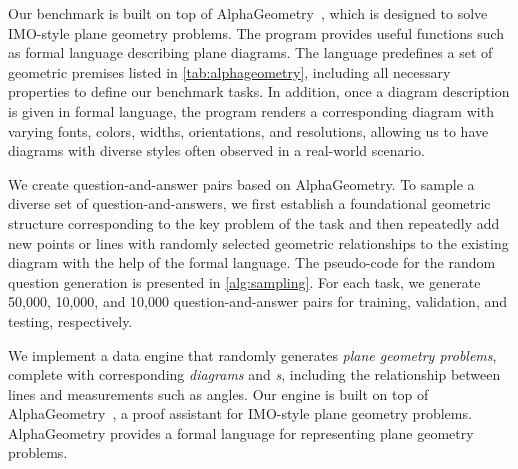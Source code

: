 

Our benchmark is built on top of AlphaGeometry~\citep{alphageometry}, which is designed to solve IMO-style plane geometry problems. The program provides useful functions such as formal language describing plane diagrams. The language predefines a set of geometric premises listed in \cref{tab:alphageometry}, including all necessary properties to define our benchmark tasks. In addition, once a diagram description is given in formal language, the program renders a corresponding diagram with varying fonts, colors, widths, orientations, and resolutions, allowing us to have diagrams with diverse styles often observed in a real-world scenario.

We create question-and-answer pairs based on AlphaGeometry. To sample a diverse set of question-and-answers, we first establish a foundational geometric structure corresponding to the key problem of the task and then repeatedly add new points or lines with randomly selected geometric relationships to the existing diagram with the help of the formal language. The pseudo-code for the random question generation is presented in \cref{alg:sampling}. For each task, we generate 50,000, 10,000, and 10,000 question-and-answer pairs for training, validation, and testing, respectively.

\iffalse
We implement a data engine that randomly generates \emph{plane geometry problems}, complete with corresponding \emph{diagrams} and \emph{\geofeat{}s}, including the relationship between lines and measurements such as angles. Our engine is built on top of AlphaGeometry~\citep{alphageometry}, a proof assistant for IMO-style plane geometry problems. AlphaGeometry provides a formal language for representing plane geometry problems. 

